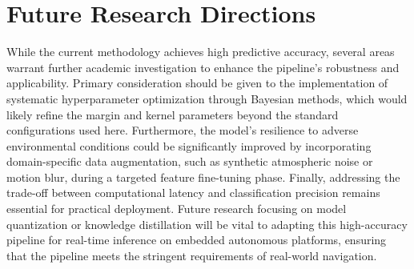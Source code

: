 \section{Future Research Directions}
While the current methodology achieves high predictive accuracy, several areas warrant further academic investigation to enhance the pipeline's robustness and applicability. Primary consideration should be given to the implementation of systematic hyperparameter optimization through Bayesian methods, which would likely refine the margin and kernel parameters beyond the standard configurations used here. Furthermore, the model's resilience to adverse environmental conditions could be significantly improved by incorporating domain-specific data augmentation, such as synthetic atmospheric noise or motion blur, during a targeted feature fine-tuning phase. Finally, addressing the trade-off between computational latency and classification precision remains essential for practical deployment. Future research focusing on model quantization or knowledge distillation will be vital to adapting this high-accuracy pipeline for real-time inference on embedded autonomous platforms, ensuring that the pipeline meets the stringent requirements of real-world navigation.
